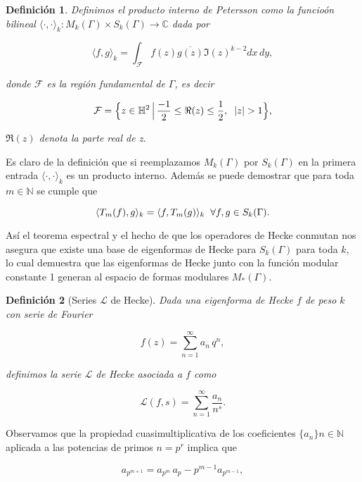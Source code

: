 \documentclass[letterpaper]{article}
\newtheorem{def.}{Definici\'on}[section]
\newcommand{\nat}{\ensuremath{ \mathbb N }}
\newcommand{\ga}{\ensuremath{\Gamma}}
\newcommand{\co}{\ensuremath{\mathbb C }}
\newcommand{\hd}{\ensuremath{\mathbb H^2}}
\newcommand{\modk}{\ensuremath{M_k(\Gamma)}}
\begin{document}
\begin{def.}\label{petersson}
Definimos el producto interno de Petersson como la funcioón bilineal $\langle\cdot ,\cdot\rangle_k:\modk\times S_k(\ga)\rightarrow\co$ dada por

\begin{equation}
\langle f , g\rangle_k = \int_{\mathcal{F}}f(z)\overline{g(z)}\Im(z)^{k-2}dx\,dy,
\end{equation}

donde $\mathcal{F}$ es la región fundamental de $\ga$, es decir

$$\mathcal{F}=\Big\lbrace z\in\hd\,\Big\vert\,\frac{-1}{2}\leq\Re(z)\leq\frac{1}{2},\hspace{0.2cm}\vert z\vert > 1\Big\rbrace,$$

$\Re(z)$ denota la parte real de z.
\end{def.}

Es claro de la definición que si reemplazamos $\modk$ por $S_k(\ga)$ en la primera entrada $\langle\cdot ,\cdot\rangle_k$ es un producto interno. Además se puede demostrar que para toda $m\in\nat$ se cumple que

$$\langle T_m(f),g\rangle_k=\langle f,T_m(g)\rangle_k\hspace{0.2cm}\forall f,g\in S_k(\ga).$$

Así el teorema espectral y el hecho de que los operadores de Hecke conmutan nos asegura que existe una base de eigenformas de Hecke para $S_k(\ga)$ para toda $k$, lo cual demuestra que las eigenformas de Hecke junto con la función modular constante 1 generan al espacio de formas modulares $M_{\ast}(\ga)$.

\begin{def.}[Series $\mathcal{L}$ de Hecke]\label{hecke-l}
Dada una eigenforma de Hecke $f$ de peso $k$ con serie de Fourier

$$f(z) = \sum_{n=1}^{\infty}a_n\,q^n,$$

definimos la serie $\mathcal{L}$ de Hecke asociada a $f$ como

\begin{equation}
\mathcal{L}(f,s)=\sum_{n=1}^{\infty}\frac{a_n}{n^s}.
\end{equation}
\end{def.}

Observamos que la propiedad cuasimultiplicativa de los coeficientes $\lbrace a_n\rbrace{n\in\nat}$ aplicada a las potencias de primos $n=p^r$ implica que

$$
a_{p^{m+1}}=a_{p^m}\,a_p-p^{m-1}a_{p^{m-1}},
$$
\end{document}

